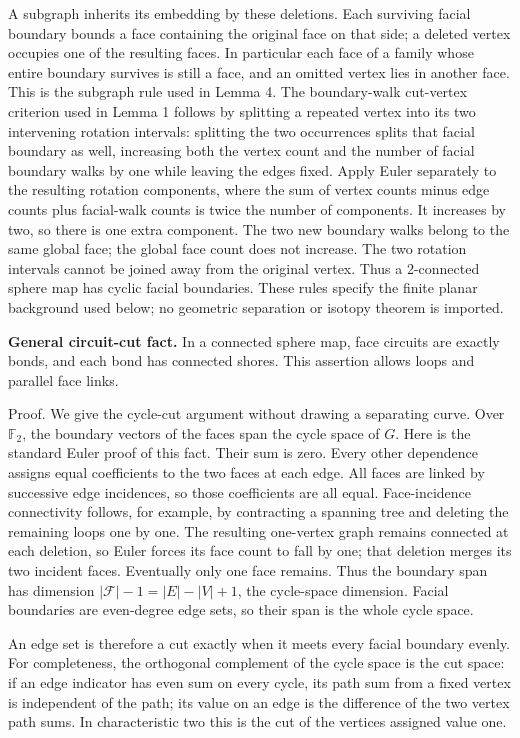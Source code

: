 \documentclass[a4paper,11pt]{amsart}
\begin{document}
A subgraph inherits its embedding by these deletions. Each surviving facial boundary bounds a face containing the original face on that side; a deleted vertex occupies one of the resulting faces. In particular each face of a family whose entire boundary survives is still a face, and an omitted vertex lies in another face. This is the subgraph rule used in Lemma 4. The boundary-walk cut-vertex criterion used in Lemma 1 follows by splitting a repeated vertex into its two intervening rotation intervals: splitting the two occurrences splits that facial boundary as well, increasing both the vertex count and the number of facial boundary walks by one while leaving the edges fixed. Apply Euler separately to the resulting rotation components, where the sum of vertex counts minus edge counts plus facial-walk counts is twice the number of components. It increases by two, so there is one extra component. The two new boundary walks belong to the same global face; the global face count does not increase. The two rotation intervals cannot be joined away from the original vertex. Thus a 2-connected sphere map has cyclic facial boundaries. These rules specify the finite planar background used below; no geometric separation or isotopy theorem is imported.

\textbf{General circuit-cut fact.} In a connected sphere map, face circuits are exactly bonds, and each bond has connected shores. This assertion allows loops and parallel face links.

Proof. We give the cycle-cut argument without drawing a separating curve. Over $\mathbb F_2$, the boundary vectors of the faces span the cycle space of $G$. Here is the standard Euler proof of this fact. Their sum is zero. Every other dependence assigns equal coefficients to the two faces at each edge. All faces are linked by successive edge incidences, so those coefficients are all equal. Face-incidence connectivity follows, for example, by contracting a spanning tree and deleting the remaining loops one by one. The resulting one-vertex graph remains connected at each deletion, so Euler forces its face count to fall by one; that deletion merges its two incident faces. Eventually only one face remains. Thus the boundary span has dimension $|\mathcal F|-1=|E|-|V|+1$, the cycle-space dimension. Facial boundaries are even-degree edge sets, so their span is the whole cycle space.

An edge set is therefore a cut exactly when it meets every facial boundary evenly. For completeness, the orthogonal complement of the cycle space is the cut space: if an edge indicator has even sum on every cycle, its path sum from a fixed vertex is independent of the path; its value on an edge is the difference of the two vertex path sums. In characteristic two this is the cut of the vertices assigned value one.
\end{document}
